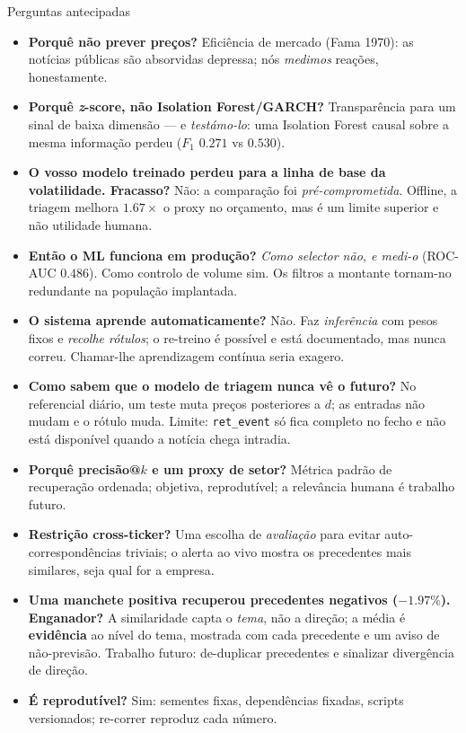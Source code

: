 \documentclass[aspectratio=169]{beamer}
\begin{document}
\begin{frame}{Perguntas antecipadas}
\footnotesize
\begin{itemize}
  \item \textbf{Porquê não prever preços?} Eficiência de mercado (Fama 1970): as notícias públicas são absorvidas depressa; nós \emph{medimos} reações, honestamente.
  \item \textbf{Porquê \emph{z}-score, não Isolation Forest/GARCH?} Transparência para um sinal de baixa dimensão --- e \emph{testámo-lo}: uma Isolation Forest causal sobre a mesma informação perdeu ($F_1$ $0.271$ vs $0.530$).
  \item \textbf{O vosso modelo treinado perdeu para a linha de base da volatilidade. Fracasso?} Não: a comparação foi \emph{pré-comprometida}. Offline, a triagem melhora $1.67\times$ o proxy no orçamento, mas é um limite superior e não utilidade humana.
  \item \textbf{Então o ML funciona em produção?} \emph{Como selector não, e medi-o} (ROC-AUC $0.486$). Como controlo de volume sim. Os filtros a montante tornam-no redundante na população implantada.
  \item \textbf{O sistema aprende automaticamente?} Não. Faz \emph{inferência} com pesos fixos e \emph{recolhe rótulos}; o re-treino é possível e está documentado, mas nunca correu. Chamar-lhe aprendizagem contínua seria exagero.
  \item \textbf{Como sabem que o modelo de triagem nunca vê o futuro?} No referencial diário, um teste muta preços posteriores a $d$; as entradas não mudam e o rótulo muda. Limite: \texttt{ret\_event} só fica completo no fecho e não está disponível quando a notícia chega intradia.
  \item \textbf{Porquê precisão@$k$ e um proxy de setor?} Métrica padrão de recuperação ordenada; objetiva, reprodutível; a relevância humana é trabalho futuro.
  \item \textbf{Restrição cross-ticker?} Uma escolha de \emph{avaliação} para evitar auto-correspondências triviais; o alerta ao vivo mostra os precedentes mais similares, seja qual for a empresa.
  \item \textbf{Uma manchete positiva recuperou precedentes negativos ($-1.97\%$). Enganador?} A similaridade capta o \emph{tema}, não a direção; a média é \textbf{evidência} ao nível do tema, mostrada com cada precedente e um aviso de não-previsão. Trabalho futuro: de-duplicar precedentes e sinalizar divergência de direção.
  \item \textbf{É reprodutível?} Sim: sementes fixas, dependências fixadas, scripts versionados; re-correr reproduz cada número.
\end{itemize}
\end{frame}
\end{document}

